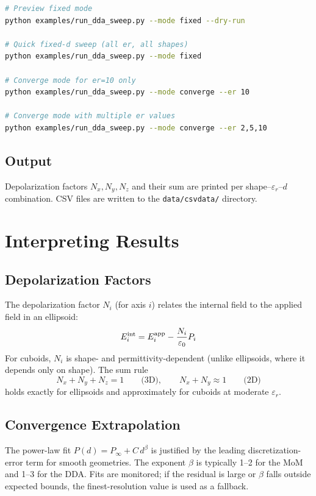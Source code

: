 \documentclass[a4paper,11pt]{article}
\begin{document}
\begin{lstlisting}[language=bash]
# Preview fixed mode
python examples/run_dda_sweep.py --mode fixed --dry-run

# Quick fixed-d sweep (all er, all shapes)
python examples/run_dda_sweep.py --mode fixed

# Converge mode for er=10 only
python examples/run_dda_sweep.py --mode converge --er 10

# Converge mode with multiple er values
python examples/run_dda_sweep.py --mode converge --er 2,5,10
\end{lstlisting}

\subsection{Output}

Depolarization factors $N_x, N_y, N_z$ and their sum are printed per
shape--$\varepsilon_r$--$d$ combination.  CSV files are written to the
\texttt{data/csvdata/} directory.

\section{Interpreting Results}

\subsection{Depolarization Factors}

The depolarization factor $N_i$ (for axis $i$) relates the internal field to
the applied field in an ellipsoid:
\[
E_i^{\rm int} = E_i^{\rm app} - \frac{N_i}{\varepsilon_0} P_i
\]
For cuboids, $N_i$ is shape- and permittivity-dependent (unlike ellipsoids,
where it depends only on shape).  The sum rule
\[
N_x + N_y + N_z = 1 \qquad \text{(3D)},\qquad
N_x + N_y \approx 1 \qquad \text{(2D)}
\]
holds exactly for ellipsoids and approximately for cuboids at moderate
$\varepsilon_r$.

\subsection{Convergence Extrapolation}

The power-law fit $P(d) = P_\infty + C\,d^\beta$ is justified by the leading
discretization-error term for smooth geometries.  The exponent $\beta$ is
typically 1--2 for the MoM and 1--3 for the DDA.  Fits are monitored;
if the residual is large or $\beta$ falls outside expected bounds,
the finest-resolution value is used as a fallback.
\end{document}
